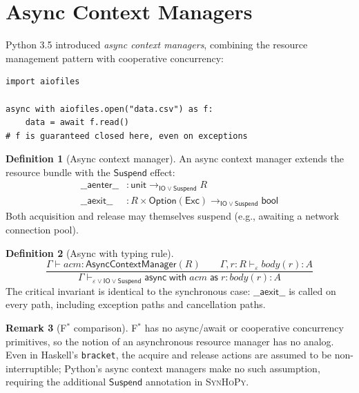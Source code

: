 \documentclass[11pt,a4paper]{report}
\theoremstyle{definition}
\newtheorem{definition}{Definition}[chapter]
\newtheorem{remark}[definition]{Remark}
\theoremstyle{plain}
\newcommand{\IO}{\mathsf{IO}}
\newcommand{\fstar}{F$^{*}$}
\newcommand{\synhopy}{\textsc{SynHoPy}}
\begin{document}
\section{Async Context Managers}

Python 3.5 introduced \emph{async context managers}, combining the resource
management pattern with cooperative concurrency:

\begin{lstlisting}[style=python]
import aiofiles

async with aiofiles.open("data.csv") as f:
    data = await f.read()
# f is guaranteed closed here, even on exceptions
\end{lstlisting}

\begin{definition}[Async context manager]
An async context manager extends the resource bundle with the
$\mathsf{Suspend}$ effect:
\begin{align}
  \mathsf{\_\_aenter\_\_} &: \mathsf{unit} \to_{\IO \vee \mathsf{Suspend}} R \\
  \mathsf{\_\_aexit\_\_} &: R \times \mathsf{Option}(\mathsf{Exc})
    \to_{\IO \vee \mathsf{Suspend}} \mathsf{bool}
\end{align}
Both acquisition and release may themselves suspend (e.g., awaiting a network
connection pool).
\end{definition}

\begin{definition}[Async with typing rule]
\[
  \frac{
    \Gamma \vdash \mathit{acm} : \mathsf{AsyncContextManager}(R) \qquad
    \Gamma, r : R \vdash_\varepsilon \mathit{body}(r) : A
  }{
    \Gamma \vdash_{\varepsilon \vee \IO \vee \mathsf{Suspend}}
      \mathsf{async\;with}\;\mathit{acm}\;\mathsf{as}\;r : \mathit{body}(r) : A
  }
\]
The critical invariant is identical to the synchronous case:
$\mathsf{\_\_aexit\_\_}$ is called on every path, including exception paths
and cancellation paths.
\end{definition}

\begin{remark}[\fstar{} comparison]
\fstar{} has no async/await or cooperative concurrency primitives, so the
notion of an asynchronous resource manager has no analog.  Even in Haskell's
\texttt{bracket}, the acquire and release actions are assumed to be
non-interruptible; Python's async context managers make no such assumption,
requiring the additional $\mathsf{Suspend}$ annotation in \synhopy{}.
\end{remark}
\end{document}
